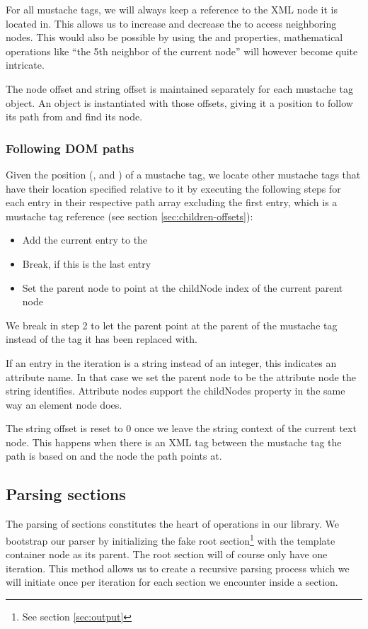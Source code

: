 \documentclass[thesis.tex]{subfiles}
\begin{document}
For all mustache tags, we will always keep a reference to the 
XML node it is located in. This allows us to increase and decrease the
 to access neighboring nodes. This would also be possible by
using the  and  properties,
mathematical operations like ``the 5th neighbor of the current node'' will
however become quite intricate.

The node offset and string offset is maintained separately for each mustache tag
object. An object is instantiated with those offsets, giving it a position to
follow its path from and find its node.

\subsubsection{Following DOM paths}
Given the position (,  and )
of a mustache tag, we locate other mustache tags that have their location
specified relative to it by executing the following steps for each entry in
their respective path array
excluding the first entry, which is a mustache tag reference
(see section \ref{sec:children-offsets}):
\begin{itemize}
\item Add the current entry to the 
\item Break, if this is the last entry
\item Set the parent node to point at the childNode index  of
      the current parent node
\end{itemize}
We break in step 2 to let the parent point at the parent of the mustache tag
instead of the tag it has been replaced with.

If an entry in the iteration is a string instead of an integer, this indicates
an attribute name. In that case we set the parent node to be the attribute node
the string identifies.
Attribute nodes support the childNodes property in the same way an element node
does.

The string offset is reset to 0 once we leave the string context of the
current text node. This happens when there is an XML tag between the
mustache tag the path is based on and the node the path points at.

\subsection{Parsing sections}
The parsing of sections constitutes the heart of operations in our library.
We bootstrap our parser by initializing the fake root
section\footnote{See section \ref{sec:output}} with the template container node
as its parent.
The root section will of course only have one iteration.
This method allows us to create a recursive parsing process which we will
initiate once per iteration for each section we encounter inside a section.
\end{document}
